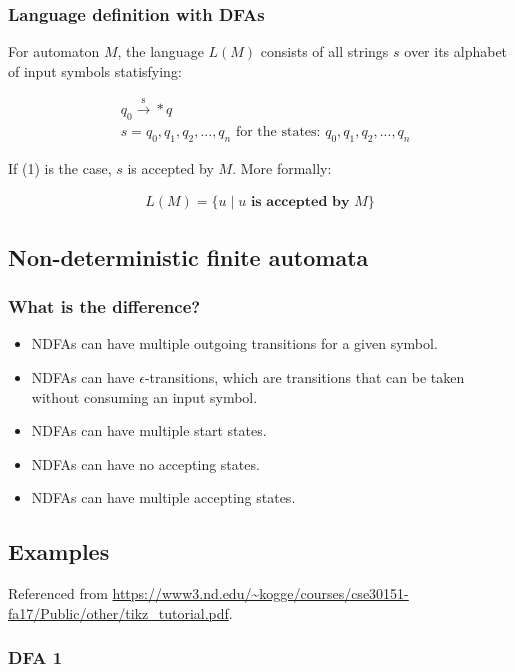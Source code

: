 \documentclass{article}
\begin{document}
\subsubsection{Language definition with DFAs}

For automaton $M$, the language $L(M)$ consists of all strings $s$ over its alphabet of input symbols statisfying:

\begin{align}
     & q_0 \xrightarrow{\text{s}} * q                                           \\
     & s = q_0,q_1,q_2,...,q_n \text{ for the states: } q_0, q_1, q_2, ..., q_n
\end{align}

If (1) is the case, $s$ is accepted by $M$.
More formally:

\begin{align*}
    L(M) = \{u \mid u \textbf{ is accepted by } M\}
\end{align*}

\subsection{Non-deterministic finite automata}

\subsubsection{What is the difference?}

\begin{itemize}
    \item NDFAs can have multiple outgoing transitions for a given symbol.
    \item NDFAs can have $\epsilon$-transitions, which are transitions that can be taken without consuming an input symbol.
    \item NDFAs can have multiple start states.
    \item NDFAs can have no accepting states.
    \item NDFAs can have multiple accepting states.
\end{itemize}
\subsection{Examples}

Referenced from \url{https://www3.nd.edu/~kogge/courses/cse30151-fa17/Public/other/tikz_tutorial.pdf}.

\subsubsection{DFA 1}
\end{document}
